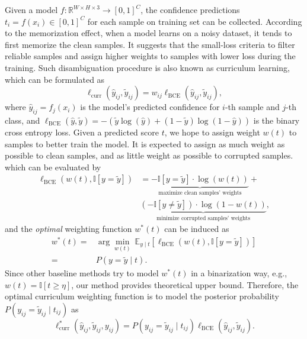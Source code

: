 \documentclass[letterpaper]{article} %
\begin{document}
  Given a model \(f: \mathbb{R}^{W \times H \times 3} \rightarrow [0, 1]^{C}\), the confidence predictions \(t_i = f(x_i) \in [0, 1]^{C}\) for each sample on training set can be collected.
  According to the memorization effect, when a model learns on a noisy dataset, it tends to first memorize the clean samples. It suggests that the small-loss criteria to filter reliable samples and assign higher weights to samples with lower loss during the training. Such disambiguation procedure is also known as curriculum learning, which can be formulated as
  \begin{equation}
    \ell_\text{curr}(\hat y_{ij}, \tilde y_{ij}) = w_{ij} \ell_\text{BCE}(\hat y_{ij}, \tilde y_{ij}),
  \end{equation}
  where $\hat y_{ij} = f_j(x_i)$ is the model's predicted confidence for $i$-th sample and $j$-th class, and $\ell_\text{BCE}(\hat y, \tilde y) = -\left(\tilde y \log(\hat y) + (1 - \tilde y) \log(1 - \hat y)\right)$ is the binary cross entropy loss.
  Given a predicted score $t$, we hope to assign weight $w(t)$ to samples to better train the model. 
  It is expected to assign as much weight as possible to clean samples, and as little weight as possible to corrupted samples. which can be evaluated by
  \begin{equation}
  \begin{aligned}
    \ell_\text{BCE}\left(w(t), \mathbb{I}[y = \tilde y] \right) 
    & = \underbrace{- \mathbb{I}[y = \tilde y] \cdot \log (w(t))}_\text{maximize clean samples' weights}
      + \\ & \underbrace{(-\mathbb{I}[y \neq \tilde y]) \cdot \log (1 - w(t))}_\text{minimize corrupted samples' weights},
  \end{aligned}
  \end{equation}
  and the \textit{optimal} weighting function $w^*(t)$ can be induced as
  \begin{equation}
  \begin{aligned}
    w^{*}(t) = & \arg \min_{w(t)} \ \mathbb{E}_{y \mid t} \left[ \ell_\text{BCE}(w(t),\mathbb{I}[y=\tilde y]) \right] \\
    = \ & P(y=\tilde y \mid t).
  \end{aligned}
  \end{equation}
  Since other baseline methods try to model $w^*(t)$ in a binarization way, e.g., $w(t) = \mathbb{I}[t \geq \eta]$, our method provides theoretical upper bound. 
  Therefore, the optimal curriculum weighting function is to model the posterior probability $P(y_{ij} = \tilde y_{ij} \mid t_{ij})$ as
  \begin{equation}
  \label{eq:optimal-weight}
    \ell^*_\text{curr}(\hat y_{ij}, \tilde y_{ij}, y_{ij}) 
    = P(y_{ij} = \tilde y_{ij} \mid t_{ij}) \ell_\text{BCE}(\hat y_{ij}, \tilde y_{ij}).
  \end{equation}
\end{document}
